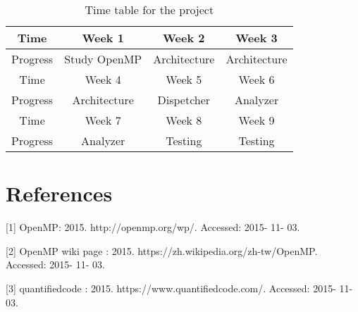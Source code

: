 \documentclass{acm_proc_article-sp}
\begin{document}
\begin{table}
	\centering
	\caption{Time table for the project}
	\begin{tabular}{|c|c|c|c|} \hline
	Time&Week 1&Week 2&Week 3\\
	\hline
	Progress&Study OpenMP&Architecture&Architecture\\
	\hline
	\hline
	Time&Week 4&Week 5&Week 6\\
	\hline
	Progress&Architecture&Dispetcher&Analyzer\\
	\hline
	\hline
	Time&Week 7&Week 8&Week 9\\
	\hline
	Progress&Analyzer&Testing&Testing\\
	\hline
	\end{tabular}
\end{table}

\section{References}
[1] OpenMP: 2015. http://openmp.org/wp/. Accessed: 2015- 11- 03.

[2] OpenMP wiki page : 2015. https://zh.wikipedia.org/zh-tw/OpenMP. Accessed: 2015- 11- 03.

[3] quantifiedcode : 2015. https://www.quantifiedcode.com/. Accessed: 2015- 11- 03.
\end{document}
